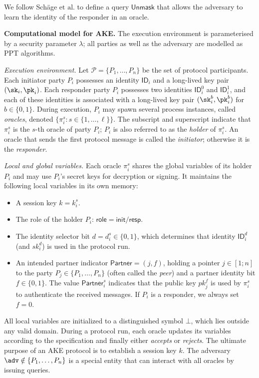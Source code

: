 \documentclass[runningheads]{llncs}
\newcommand{\et}{\text{et al.}}
\begin{document}
We follow Sch{\"a}ge $\et$ to define a query $\mathsf{Unmask}$ that allows the adversary to learn the identity of the responder in an oracle.

\smallskip\noindent\textbf{Computational model for AKE.}
The execution environment is parameterised by a security parameter $\lambda$; all parties as well as the adversary are modelled as PPT algorithms.

\smallskip\noindent\textit{Execution environment.}
Let $\mathcal{P} = \{P_1, \ldots, P_n\}$ be the set of protocol participants. Each initiator party $P_i$ possesses an identity $\mathsf{ID}_i$ and a long-lived key pair $(\sk_i, \pk_i)$.
Each responder party $P_i$ possesses two identities $\mathsf{ID}_i^{0}$ and $\mathsf{ID}_i^{1}$, and each of these identities is associated with a long-lived key pair $(\sk_i^{b}, \pk_i^{b})$ for $b\in \{0,1\}$.
During execution, $P_i$ may spawn several process instances, called \textit{oracles}, denoted $\{\pi_i^s : s \in \{1, \ldots, \ell\}\}$.
The subscript and superscript indicate that $\pi_i^s$ is the $s$-th oracle of party $P_i$; $P_i$ is also referred to as the \textit{holder} of $\pi_i^s$.
An oracle that sends the first protocol message is called the \textit{initiator}; otherwise it is the \textit{responder}.

\smallskip\noindent\textit{Local and global variables.}
Each oracle $\pi_i^s$ shares the global variables of its holder $P_i$ and may use $P_i$’s secret keys for decryption or signing. It maintains the following local variables in its own memory:
\begin{itemize}
\item A session key $k = k_i^s$.
\item The role of the holder $P_{i}$: $\mathsf{role}= \mathsf{init}/\mathsf{resp}$.
\item The identity selector bit $d = d_{i}^{s}\in \{0,1\}$, which determines that identity $\mathsf{ID}_{i}^{d}$ (and ${sk}_{i}^{d}$) is used in the protocol run.
\item An intended partner indicator $\mathsf{Partner} = (j,f)$, holding a pointer $j \in [1;n]$ to the party $P_j \in \{P_1, \ldots, P_n\}$ (often called the \textit{peer}) and a partner identity bit $f\in \{0,1\}$. The value $\mathsf{Partner}_{i}^{s}$ indicates that the public key ${pk}_{j}^{f}$ is used by $\pi_i^s$ to authenticate the received messages.
If $P_{i}$ is a responder, we always set $f = 0$.
\end{itemize}
All local variables are initialized to a distinguished symbol $\bot$, which lies outside any valid domain. During a protocol run, each oracle updates its variables according to the specification and finally either \textit{accepts} or \textit{rejects}. The ultimate purpose of an AKE protocol is to establish a session key $k$.
The adversary $\adv \notin \{P_1, \ldots, P_n\}$ is a special entity that can interact with all oracles by issuing queries.
\end{document}
